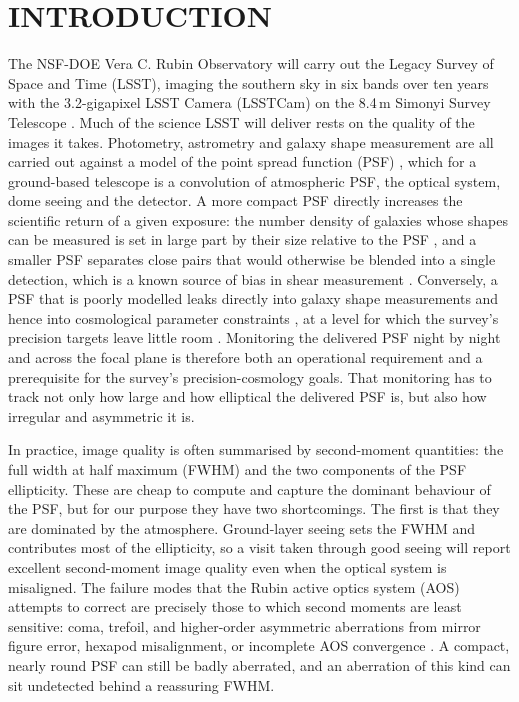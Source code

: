 \documentclass[]{spie}
\begin{document}
\section{INTRODUCTION}
\label{intro:0}
The NSF-DOE Vera C. Rubin Observatory will carry out the Legacy Survey of Space and Time
(LSST), imaging the southern sky in six bands over ten years with the 3.2-gigapixel LSST
Camera (LSSTCam) on the 8.4\,m Simonyi Survey Telescope \cite{Ivezic2019}. Much of the
science LSST will deliver rests on the quality of the images it takes. Photometry,
astrometry and galaxy shape measurement are all carried out against a model of the point
spread function (PSF) \cite{Bosch2018}, which for a ground-based telescope is a convolution
of atmospheric PSF, the optical system, dome seeing and the detector. A more compact PSF
directly increases the scientific return of a given exposure: the number density of
galaxies whose shapes can be measured is set in large part by their size relative to the
PSF \cite{Chang2013}, and a smaller PSF separates close pairs that would otherwise be
blended into a single detection, which is a known source of bias in shear measurement
\cite{Dawson2016, Nourbakhsh2022}. Conversely, a PSF that is poorly modelled leaks directly
into galaxy shape measurements and hence into cosmological parameter constraints
\cite{HirataSeljak2003, Mandelbaum2018, Jarvis2021, Zhang2023}, at a level for which the
survey's precision targets leave little room \cite{DESC_SRD}. Monitoring the delivered PSF
night by night and across the focal plane is therefore both an operational requirement and
a prerequisite for the survey's precision-cosmology goals. That monitoring has to track not
only how large and how elliptical the delivered PSF is, but also how irregular and
asymmetric it is.

In practice, image quality is often summarised by second-moment quantities: the full width
at half maximum (FWHM) and the two components of the PSF ellipticity. These are cheap to
compute and capture the dominant behaviour of the PSF, but for our purpose they have two
shortcomings. The first is that they are dominated by the atmosphere. Ground-layer seeing
sets the FWHM and contributes most of the ellipticity, so a visit taken through good
seeing will report excellent second-moment image quality even when the optical system is
misaligned. The failure modes that the Rubin active optics system (AOS) attempts to correct
are precisely those to which second moments are least sensitive: coma, trefoil, and
higher-order asymmetric aberrations from mirror figure error, hexapod misalignment, or
incomplete AOS convergence \cite{Xin2015}. A compact, nearly round PSF can still be badly
aberrated, and an aberration of this kind can sit undetected behind a reassuring FWHM.
\end{document}

